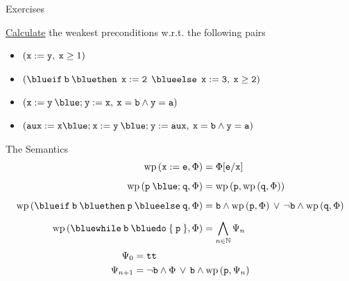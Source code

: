 \documentclass{beamer}
\begin{document}
\begin{frame}{Exercises}
        
        \alert{\underline{Calculate}} the weakest preconditions w.r.t. the following pairs
        \\[7pt]
        \begin{itemize}
                \item $(\mathtt{x := y}, \>  \mathtt{x} \geq 1)$
                        \\[7pt]
                \item $(\prog{{\blue if} \>  b \> {\blue then} \> \> 
                        x:=2 \> \> {\blue else} \> \> x:= 3}, \> \prog{x \geq 2})$
                        \\[7pt]
                \item $(\prog{x:= y \> {\blue ;} \> y := x}, \> \prog{ x = b \wedge y = a })$
                        \\[7pt]
                \item $(\prog{ aux := x {\blue ;} \> 
                        x:= y \> {\blue ;} \> y := aux}, \> \prog{ x = b \wedge y = a })$
        \end{itemize}
\end{frame}

\begin{frame}{The Semantics}
        \begin{align*}
                \mathrm{wp}\,(\prog{x : = e}, \Phi) & = \Phi[\prog{e}/\prog{x}] \\[5pt]
                \mathrm{wp}\,(\prog{p} \> {\blue ;} \> \prog{q}, \Phi) & 
                = \mathrm{wp} \, (\prog{p}, \mathrm{wp} \, (\prog{q}, \Phi))  \\[5pt]
                \mathrm{wp}\,({\mathtt{{\blue if} \> b \> {\blue then} \> p \> {\blue else} \> q}}, \Phi)
                & 
                =
                \prog{b} \wedge \mathrm{wp}\, (\prog{p},\Phi) \, \vee \,
                \prog{\neg b} \wedge \mathrm{wp} \, (\prog{q}, \Phi)
                \\[5pt]
                \mathrm{wp} \, ({\mathtt{{\blue while} \> b \> {\blue do} \> \{ \> p \> \}} }, \Phi)
                & = \bigwedge_{n \in \Nats} \Psi_n
        \end{align*}
        \pause
        \vspace{-0.5cm}
        \begin{align*}
                \Psi_0 & = \mathtt{tt} \\
                \Psi_{n+1} & = \neg \mathtt{b} \wedge \Phi \, \vee \, \mathtt{b} \wedge 
                \mathrm{wp} \, (\mathtt{p}, \Psi_n)
        \end{align*}
\end{frame}
\end{document}
